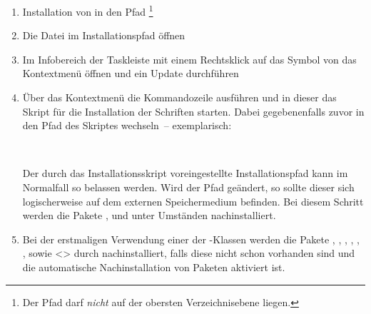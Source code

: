 \begin{enumerate}
\item Installation von  in den Pfad
  \footnote{Der Pfad darf \emph{nicht} auf der obersten Verzeichnisebene 
   liegen.
  }
\item Die Datei  im Installationspfad öffnen
\item Im Infobereich der Taskleiste mit einem Rechtsklick auf das Symbol von 
   das Kontextmenü öffnen und ein Update 
  durchführen
\item Über das Kontextmenü die Kommandozeile ausführen und in dieser das Skript 
  für die Installation der Schriften  starten.
  Dabei gegebenenfalls zuvor in den Pfad des Skriptes wechseln~-- exemplarisch:
  \begin{quoting}[rightmargin=0pt]
  \newline
  \,
  \end{quoting}
  Der durch das Installationsskript voreingestellte Installationspfad kann im 
  Normalfall so belassen werden. Wird der Pfad geändert, so sollte dieser sich 
  logischerweise auf dem externen Speichermedium 
   befinden. Bei diesem Schritt 
  werden die Pakete ,  und  
  unter Umständen nachinstalliert.
\item Bei der erstmaligen Verwendung einer der \TUDScript-Klassen werden die 
  Pakete , , , 
  , , , 
   sowie <> durch 
   nachinstalliert, falls diese nicht 
  schon vorhanden sind und die automatische Nachinstallation von Paketen 
  aktiviert ist.
\end{enumerate}
